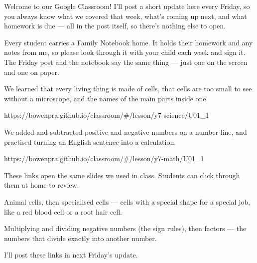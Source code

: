 \documentclass[11pt]{article}
\begin{document}
\begin{annbody}

Welcome to our Google Classroom! I'll post a short update here every Friday, so
you always know what we covered that week, what's coming up next, and what
homework is due --- all in the post itself, so there's nothing else to open.


Every student carries a Family Notebook home. It holds their homework and any
notes from me, so please look through it with your child each week and sign it.
The Friday post and the notebook say the same thing --- just one on the screen
and one on paper.


We learned that every living thing is made of cells, that cells are too small to
see without a microscope, and the names of the main parts inside one.\par
\vspace{3pt}%
  {https://bowenpra.github.io/classroom/\#/lesson/y7-science/U01\_1}

We added and subtracted positive and negative numbers on a number line, and
practised turning an English sentence into a calculation.\par
\vspace{3pt}%
  {https://bowenpra.github.io/classroom/\#/lesson/y7-math/U01\_1}

\vspace{5pt}
These links open the same slides we used in class. Students can click through
them at home to review.


Animal cells, then specialised cells --- cells with a special shape for a
special job, like a red blood cell or a root hair cell.

Multiplying and dividing negative numbers (the sign rules), then factors ---
the numbers that divide exactly into another number.

\vspace{5pt}
I'll post these links in next Friday's update.



\end{annbody}
\end{document}
